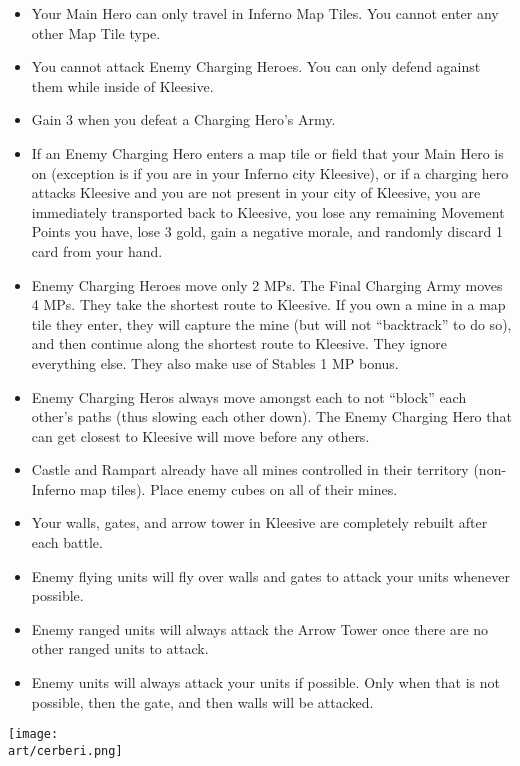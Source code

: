 \begin{multicols*}{2}
\begin{itemize}
  \item Your Main Hero can only travel in Inferno Map Tiles. You cannot enter any other Map Tile type.
  \item You cannot attack Enemy Charging Heroes. You can only defend against them while inside of Kleesive.
  \item Gain 3 when you defeat a Charging Hero's Army.
  \item If an Enemy Charging Hero enters a map tile or field that your Main Hero is on (exception is if you are in
    your Inferno city Kleesive), or if a charging hero attacks Kleesive and you are not present in your city
    of Kleesive, you are immediately transported back to Kleesive, you lose any remaining Movement Points
    you have, lose 3 gold, gain a negative morale, and randomly discard 1 card from your hand.
  \item Enemy Charging Heroes move only 2 MPs. The Final Charging Army moves 4 MPs. They take the shortest
    route to Kleesive. If you own a mine in a map tile they enter, they will capture the mine (but will not
    ``backtrack'' to do so), and then continue along the shortest route to Kleesive. They ignore everything
    else. They also make use of Stables 1 MP bonus.
  \item Enemy Charging Heros always move amongst each to not ``block'' each other's paths (thus slowing each
    other down). The Enemy Charging Hero that can get closest to Kleesive will move before any others.
  \item Castle and Rampart already have all mines controlled in their territory (non-Inferno map tiles). Place enemy
    cubes on all of their mines.
  \item Your walls, gates, and arrow tower in Kleesive are completely rebuilt after each battle.
  \item Enemy flying units will fly over walls and gates to attack your units whenever possible.
  \item Enemy ranged units will always attack the Arrow Tower once there are no other ranged units to attack.
  \item Enemy units will always attack your units if possible. Only when that is not possible, then the gate,
    and then walls will be attacked.
\end{itemize}

\vspace*{1em}
\texttt{[image: \\art/cerberi.png]}

\end{multicols*}

